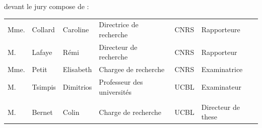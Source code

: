 \begin{titlepage}
\begin{center}
devant le jury compose de :

\vspace{1em}

{
\begin{tabular}{llllll}
Mme.   & Collard & Caroline  &  Directrice de recherche & CNRS      & Rapporteure \\
M.  & Lafaye & Rémi &  Directeur de recherche & CNRS   & Rapporteur\\
Mme.  & Petit  & Elisabeth &   Chargee de recherche & CNRS & Examinatrice\\
M.   & Tsimpis   & Dimitrios &  Professeur des universités & UCBL   & Examinateur \\
\\
M.   & Bernet  & Colin & Charge de recherche &UCBL   & Directeur de these
\end{tabular}
}
\end{center}

\vspace{1em}
\vfil



\end{titlepage}

        
        
        
                


